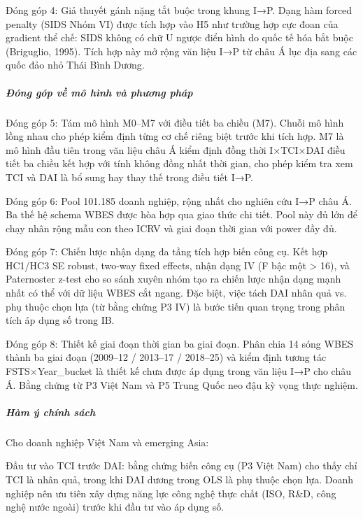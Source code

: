 \documentclass[12pt,a4paper]{article}
\begin{document}
Đóng góp 4: Giả thuyết gánh nặng tắt buộc trong khung I→P. Dạng hàm
forced penalty (SIDS Nhóm VI) được tích hợp vào H5 như trường hợp cực
đoan của gradient thể chế: SIDS không có chữ U ngược điển hình do quốc
tế hóa bắt buộc (Briguglio, 1995). Tích hợp này mở rộng văn liệu I→P từ
châu Á lục địa sang các quốc đảo nhỏ Thái Bình Dương.

\hypertarget{ux111uxf3ng-guxf3p-vux1ec1-muxf4-huxecnh-vuxe0-phux1b0ux1a1ng-phuxe1p}{%
\subparagraph{Đóng góp về mô hình và phương
pháp}\label{ux111uxf3ng-guxf3p-vux1ec1-muxf4-huxecnh-vuxe0-phux1b0ux1a1ng-phuxe1p}}

Đóng góp 5: Tám mô hình M0--M7 với điều tiết ba chiều (M7). Chuỗi mô
hình lồng nhau cho phép kiểm định từng cơ chế riêng biệt trước khi tích
hợp. M7 là mô hình đầu tiên trong văn liệu châu Á kiểm định đồng thời
I×TCI×DAI điều tiết ba chiều kết hợp với tính không đồng nhất thời gian,
cho phép kiểm tra xem TCI và DAI là bổ sung hay thay thế trong điều tiết
I→P.

Đóng góp 6: Pool 101.185 doanh nghiệp, rộng nhất cho nghiên cứu I→P châu
Á. Ba thế hệ schema WBES được hòa hợp qua giao thức chi tiết. Pool này
đủ lớn để chạy nhân rộng mẫu con theo ICRV và giai đoạn thời gian với
power đầy đủ.

Đóng góp 7: Chiến lược nhận dạng đa tầng tích hợp biến công cụ. Kết hợp
HC1/HC3 SE robust, two-way fixed effects, nhận dạng IV (F bậc một
\textgreater{} 16), và Paternoster z-test cho so sánh xuyên nhóm tạo ra
chiến lược nhận dạng mạnh nhất có thể với dữ liệu WBES cắt ngang. Đặc
biệt, việc tách DAI nhân quả vs. phụ thuộc chọn lựa (từ bằng chứng P3
IV) là bước tiến quan trọng trong phân tích áp dụng số trong IB.

Đóng góp 8: Thiết kế giai đoạn thời gian ba giai đoạn. Phân chia 14 sóng
WBES thành ba giai đoạn (2009--12 / 2013--17 / 2018--25) và kiểm định
tương tác FSTS×Year\_bucket là thiết kế chưa được áp dụng trong văn liệu
I→P cho châu Á. Bằng chứng từ P3 Việt Nam và P5 Trung Quốc neo đậu kỳ
vọng thực nghiệm.

\hypertarget{huxe0m-uxfd-chuxednh-suxe1ch}{%
\subparagraph{Hàm ý chính sách}\label{huxe0m-uxfd-chuxednh-suxe1ch}}

Cho doanh nghiệp Việt Nam và emerging Asia:

Đầu tư vào TCI trước DAI: bằng chứng biến công cụ (P3 Việt Nam) cho thấy
chỉ TCI là nhân quả, trong khi DAI dương trong OLS là phụ thuộc chọn
lựa. Doanh nghiệp nên ưu tiên xây dựng năng lực công nghệ thực chất
(ISO, R\&D, công nghệ nước ngoài) trước khi đầu tư vào áp dụng số.
\end{document}

